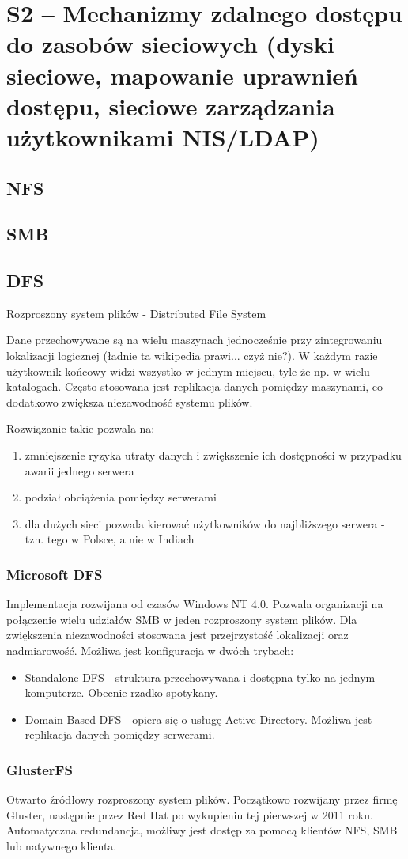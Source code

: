 \section{S2 -- Mechanizmy  zdalnego  dostępu  do  zasobów  sieciowych (dyski  sieciowe,  mapowanie  uprawnień  dostępu,  sieciowe zarządzania użytkownikami NIS/LDAP) }

\subsection{NFS}

\subsection{SMB}

\subsection{DFS}
Rozproszony system plików - Distributed File System

Dane przechowywane są na wielu maszynach jednocześnie przy zintegrowaniu lokalizacji logicznej (ładnie ta wikipedia prawi... czyż nie?). W każdym razie użytkownik końcowy widzi wszystko w jednym miejscu, tyle że np. w wielu katalogach. Często stosowana jest replikacja danych pomiędzy maszynami, co dodatkowo zwiększa niezawodność systemu plików.

Rozwiązanie takie pozwala na:
\begin{enumerate}
	\item zmniejszenie ryzyka utraty danych i zwiększenie ich dostępności w przypadku awarii jednego serwera
	\item podział obciążenia pomiędzy serwerami
	\item dla dużych sieci pozwala kierować użytkowników do najbliższego serwera - tzn. tego w Polsce, a nie w Indiach
\end{enumerate}

\subsubsection{Microsoft DFS}
Implementacja rozwijana od czasów Windows NT 4.0. Pozwala organizacji na połączenie wielu udziałów SMB w jeden rozproszony system plików. Dla zwiększenia niezawodności stosowana jest przejrzystość lokalizacji oraz nadmiarowość. Możliwa jest konfiguracja w dwóch trybach:
\begin{itemize}
\item Standalone DFS - struktura przechowywana i dostępna tylko na jednym komputerze. Obecnie rzadko spotykany.
\item Domain Based DFS - opiera się o usługę Active Directory. Możliwa jest replikacja danych pomiędzy serwerami.
\end{itemize}

\subsubsection{GlusterFS}
Otwarto źródłowy rozproszony system plików. Początkowo rozwijany przez firmę Gluster, następnie przez Red Hat po wykupieniu tej pierwszej w 2011 roku. Automatyczna redundancja, możliwy jest dostęp za pomocą klientów NFS, SMB lub natywnego klienta.